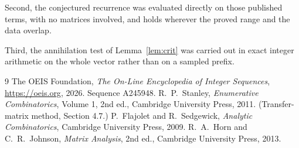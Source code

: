 \documentclass[11pt,a4paper]{article}
\theoremstyle{plain}
\theoremstyle{definition}
\begin{document}
Second, the conjectured recurrence was evaluated directly on those published terms, with no
matrices involved, and holds wherever the proved range and the data overlap.

Third, the annihilation test of Lemma~\ref{lem:crit} was carried out in exact integer
arithmetic on the whole vector rather than on a sampled prefix.

\begin{thebibliography}{9}
 The OEIS Foundation, \emph{The On-Line Encyclopedia of Integer
Sequences}, \url{https://oeis.org}, 2026. Sequence A245948.
 R.~P.~Stanley, \emph{Enumerative Combinatorics}, Volume 1, 2nd ed.,
Cambridge University Press, 2011. (Transfer-matrix method, Section 4.7.)
 P.~Flajolet and R.~Sedgewick, \emph{Analytic Combinatorics}, Cambridge
University Press, 2009.
 R.~A.~Horn and C.~R.~Johnson, \emph{Matrix Analysis}, 2nd ed., Cambridge
University Press, 2013.
\end{thebibliography}
\end{document}
